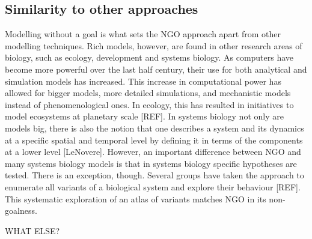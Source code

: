\subsection{Similarity to other approaches}

Modelling without a goal is what sets the NGO approach apart from other modelling techniques. Rich models, however, are found in other research areas of biology, such as ecology, development and systems biology. As computers have become more powerful over the last half century, their use for both analytical and simulation models has increased. This increase in computational power has allowed for bigger models, more detailed simulations, and mechanistic models instead of phenomenological ones. In ecology, this has resulted in initiatives to model ecosystems at planetary scale [REF]. In systems biology not only are models big, there is also the notion that one describes a system and its dynamics at a specific spatial and temporal level by defining it in terms of the components at a lower level [LeNovere]. However, an important difference between NGO and many systems biology models is that in systems biology specific hypotheses are tested. There is an exception, though. Several groups have taken the approach to enumerate all variants of a biological system and explore their behaviour [REF]. This systematic exploration of an atlas of variants matches NGO in its non-goalness.

WHAT ELSE?
